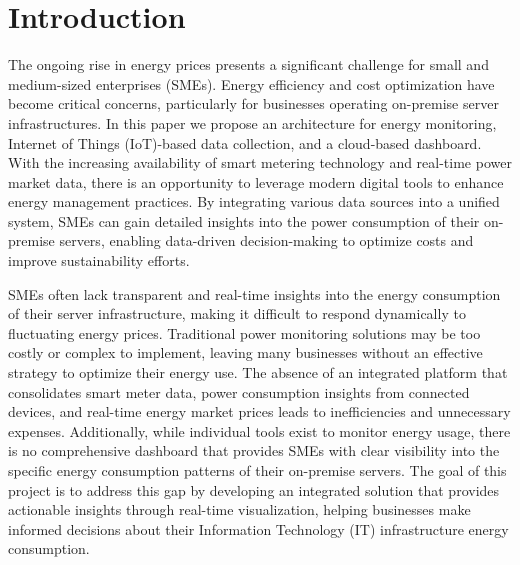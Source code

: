 
\section{Introduction}

The ongoing rise in energy prices presents a significant challenge for small and medium-sized enterprises (SMEs).
Energy efficiency and cost optimization have become critical concerns, particularly for businesses operating on-premise server infrastructures.
In this paper we propose an architecture for energy monitoring, Internet of Things (IoT)-based data collection, and a cloud-based dashboard.
With the increasing availability of smart metering technology and real-time power market data, there is an opportunity to leverage modern digital tools
to enhance energy management practices.
By integrating various data sources into a unified system, SMEs can gain detailed insights into the power consumption of their on-premise servers, 
enabling data-driven decision-making to optimize costs and improve sustainability efforts.

SMEs often lack transparent and real-time insights into the energy consumption of their server infrastructure, making it difficult to respond dynamically to fluctuating energy prices. 
Traditional power monitoring solutions may be too costly or complex to implement, leaving many businesses without an effective strategy to optimize their energy use. 
The absence of an integrated platform that consolidates smart meter data, power consumption insights from connected devices, and real-time energy market prices leads
to inefficiencies and unnecessary expenses.
Additionally, while individual tools exist to monitor energy usage, there is no comprehensive dashboard that provides SMEs with clear visibility 
into the specific energy consumption patterns of their on-premise servers. 
The goal of this project is to address this gap by developing an integrated solution that provides actionable insights through real-time visualization, 
helping businesses make informed decisions about their Information Technology (IT) infrastructure energy consumption.

